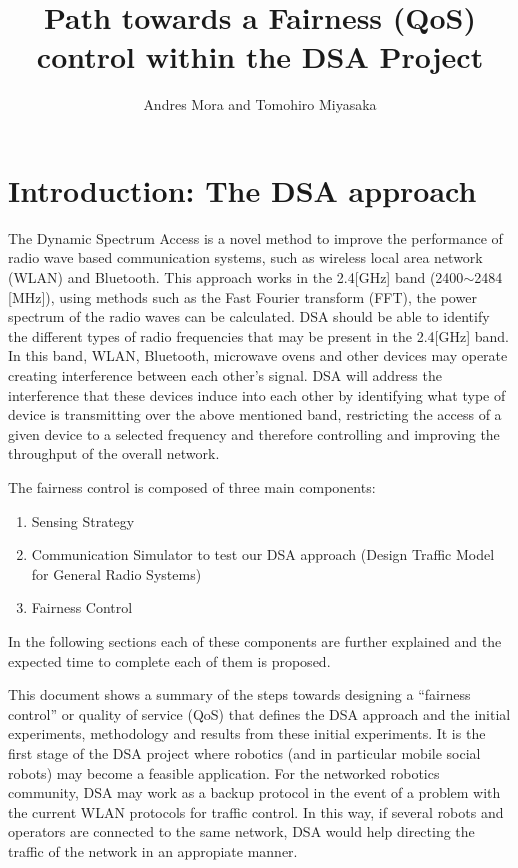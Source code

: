 \documentclass[conference]{ieeeconf}
\begin{document}
\title{Path towards a Fairness (QoS) control within the DSA Project}

\author{Andres Mora and Tomohiro Miyasaka}
\date{} %

\maketitle

\section{Introduction: The DSA approach}
The Dynamic Spectrum Access is a novel method to improve the performance of radio wave based communication systems, such as wireless local area network (WLAN) and Bluetooth.
This approach works in the 2.4[GHz] band (2400$\sim$2484 [MHz]), using methods such as the Fast Fourier transform (FFT), the power spectrum of the radio waves can be calculated.
DSA should be able to identify the different types of radio frequencies that may be present in the 2.4[GHz] band.
In this band, WLAN, Bluetooth, microwave ovens and other devices may operate creating interference between each other's signal.
DSA will address the interference that these devices induce into each other by identifying what type of device is transmitting over the above mentioned band, restricting the access of a given device to a selected frequency and therefore controlling and improving the throughput of the overall network.

The fairness control is composed of three main components:
\begin{enumerate}
  \item Sensing Strategy
  \item Communication Simulator to test our DSA approach (Design Traffic Model for General Radio Systems)
  \item Fairness Control
\end{enumerate}

In the following sections each of these components are further explained and the expected time to complete each of them is proposed.

This document shows a summary of the steps towards designing a ``fairness control'' or quality of service (QoS) that defines the DSA approach and the initial experiments, methodology and results from these initial experiments.
It is the first stage of the DSA project where robotics (and in particular mobile social robots) may become a feasible application.
For the networked robotics community, DSA may work as a backup protocol in the event of a problem with the current WLAN protocols for traffic control.
In this way, if several robots and operators are connected to the same network, DSA would help directing the traffic of the network in an appropiate manner.
\end{document}
